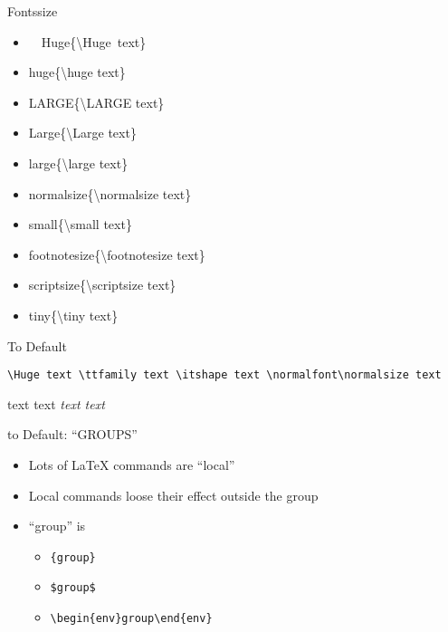 \begin{frame}[fragile]{Fonts}{size}\relax
\newcommand{\putoutside}[1]{ { \csname #1\endcsname \{{\csk \textbackslash #1} text\} } }

\begin{multicols}{2}
\hspace{-20em}
\begin{itemize}
\item \hbox{\putoutside{Huge}}
\item \putoutside{huge}
\item \putoutside{LARGE}
\item \putoutside{Large}
\item \putoutside{large}
\item \putoutside{normalsize}
\item \putoutside{small}
\item \putoutside{footnotesize}
\item \putoutside{scriptsize}
\item \putoutside{tiny}
\end{itemize}
\end{multicols}


\end{frame}

\begin{frame}[fragile]{To Default}

    \lstinline[basicstyle=\tt\normalsize]|\Huge text \ttfamily text \itshape text \normalfont\normalsize text|

     \Huge text \ttfamily text \itshape text \normalfont\normalsize text
\end{frame}

\begin{frame}[fragile]{to Default: ``GROUPS''}\relax
    \begin{itemize}
    \item Lots of \LaTeX{} commands are ``local''
    \item Local commands loose their effect outside the group 
    \item ``group'' is
    \begin{itemize}
        \item \lstinline[basicstyle=\tt\normalsize]|{group}|
        \item \lstinline[basicstyle=\tt\normalsize]|$group$|
        \item \lstinline[basicstyle=\tt\normalsize]|\begin{env}group\end{env}|
    \end{itemize}     
    \end{itemize}

\end{frame}


